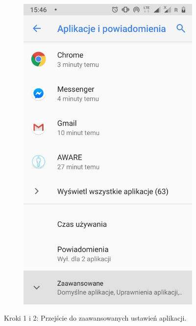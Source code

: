 \begin{enumerate}
\begin{figure}[H]
\begin{subfigure}{0.35\textwidth}
			\includegraphics[scale=0.13]{dodatekA/1_2.png}
			\subcaption{\label{subfigure_b}}
		\end{subfigure}
		\caption{ Kroki 1 i 2: Przejście do zaawansowanych ustawień aplikacji.}
	\end{figure}
	

\end{enumerate}
